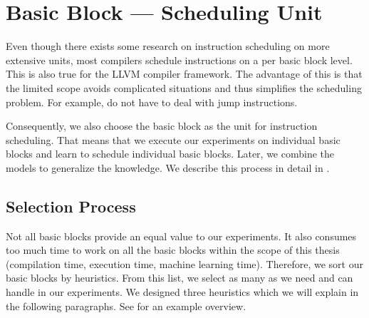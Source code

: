 \section{Basic Block --- Scheduling Unit}
\label{sec:approach:basicblock}
Even though there exists some research  on instruction scheduling on more extensive units, most compilers schedule instructions on a per basic block level.
This is also true for the LLVM compiler framework.
The advantage of this is that the limited scope avoids complicated situations and thus simplifies the scheduling problem.
For example, do not have to deal with jump instructions.

Consequently, we also choose the basic block as the unit for instruction scheduling.
That means that we execute our experiments on individual basic blocks and learn to schedule individual basic blocks.
Later, we combine the models to generalize the knowledge.
We describe this process in detail in .

\subsection{Selection Process}
\label{sec:approach:basicblock:selection}
Not all basic blocks provide an equal value to our experiments.
It also consumes too much time to work on all the basic blocks within the scope of this thesis (\eg compilation time, execution time, machine learning time).
Therefore, we sort our basic blocks by heuristics. 
From this list, we select as many as we need and can handle in our experiments.
We designed three heuristics which we will explain in the following paragraphs.
See  for an example overview.

